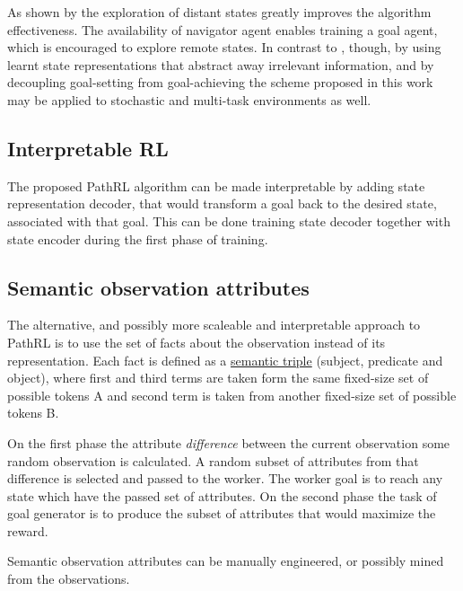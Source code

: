 \documentclass[acmsmall, nonacm]{acmart}
\begin{document}
As shown by \citet{ecoffet_first_2021} the exploration of distant states greatly improves the algorithm effectiveness. The availability of navigator agent enables training a goal agent, which is encouraged to explore remote states.
%
In contrast to \citep{ecoffet_first_2021}, though, by using learnt state representations that abstract away irrelevant information, and by decoupling goal-setting from goal-achieving the scheme proposed in this work may be applied to stochastic and multi-task environments as well.

\subsection{Interpretable RL}

The proposed PathRL algorithm can be made interpretable by adding state representation decoder, that would transform a goal back to the desired state, associated with that goal. This can be done training state decoder together with state encoder during the first phase of training.

\subsection{Semantic observation attributes}

The alternative, and possibly more scaleable and interpretable approach to PathRL is to use the set of facts about the observation instead of its representation. Each fact is defined as a \href{https://en.wikipedia.org/wiki/Semantic_triple}{semantic triple} (subject, predicate and object), where first and third terms are taken form the same fixed-size set of possible tokens A and second term is taken from another fixed-size set of possible tokens B.

On the first phase the attribute \textit{difference} between the current observation some random observation is calculated. A random subset of attributes from that difference is selected and passed to the worker. The worker goal is to reach any state which have the passed set of attributes. On the second phase the task of goal generator is to produce the subset of attributes that would maximize the reward.

Semantic observation attributes can be manually engineered, or possibly mined from the observations.
\end{document}
